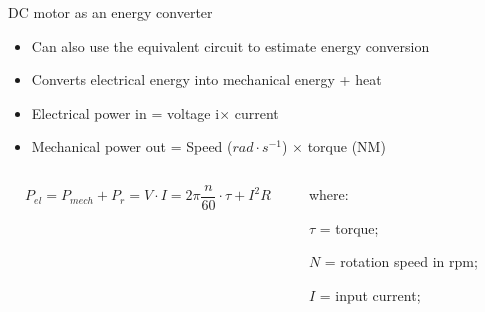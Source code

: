 \documentclass[compress]{beamer}
\begin{document}
\begin{frame}{DC motor as an energy converter}


\begin{itemize}

\item Can also use the equivalent circuit to estimate energy conversion
\item Converts electrical energy into mechanical energy + heat
\item Electrical power in = voltage i$\times$ current
\item Mechanical power out = Speed ($rad \cdot s^{-1}$) $\times$ torque (NM)
\end{itemize}

    \begin{columns}
        \begin{column}{0.7\linewidth}
    \begin{center}

    \[
        P_{el} = P_{mech} + P_{r} = V\cdot I = 2\pi\frac{n}{60}\cdot \tau + I^2 R
    \]
    \end{center}

        \end{column}
        \begin{column}{0.3\linewidth}
    \footnotesize
    where:

        $\tau$ = torque;
        
        $N$ = rotation speed in rpm;
        
        $I$ = input current;
        

\end{column}
\end{columns}
\end{frame}
\end{document}
